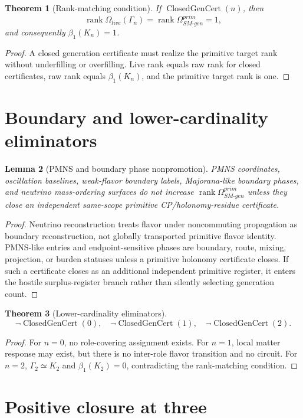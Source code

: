 \documentclass[11pt]{article}
\newcommand{\ClosedGenCert}{\operatorname{ClosedGenCert}}
\newcommand{\rank}{\operatorname{rank}}
\theoremstyle{definition}
\theoremstyle{plain}
\newtheorem{theorem}{Theorem}[section]
\newtheorem{lemma}[theorem]{Lemma}
\theoremstyle{remark}
\begin{document}
\begin{theorem}[Rank-matching condition]
If \(\ClosedGenCert(n)\), then
\[
\rank\Omega_{live}(\Gamma_n)=\rank\Omega_{SM\text{-}gen}^{prim}=1,
\]
and consequently \(\beta_1(K_n)=1\).
\end{theorem}
\begin{proof}
A closed generation certificate must realize the primitive target rank without underfilling or overfilling. Live rank equals raw rank for closed certificates, raw rank equals \(\beta_1(K_n)\), and the primitive target rank is one.
\end{proof}

\section{Boundary and lower-cardinality eliminators}

\begin{lemma}[PMNS and boundary phase nonpromotion]
PMNS coordinates, oscillation baselines, weak-flavor boundary labels, Majorana-like boundary phases, and neutrino mass-ordering surfaces do not increase \(\rank\Omega_{SM\text{-}gen}^{prim}\) unless they close an independent same-scope primitive CP/holonomy-residue certificate.
\end{lemma}
\begin{proof}
Neutrino reconstruction treats flavor under noncommuting propagation as boundary reconstruction, not globally transported primitive flavor identity. PMNS-like entries and endpoint-sensitive phases are boundary, route, mixing, projection, or burden statuses unless a primitive holonomy certificate closes. If such a certificate closes as an additional independent primitive register, it enters the hostile surplus-register branch rather than silently selecting generation count.
\end{proof}

\begin{theorem}[Lower-cardinality eliminators]
\[
\neg\ClosedGenCert(0),\quad \neg\ClosedGenCert(1),\quad \neg\ClosedGenCert(2).
\]
\end{theorem}
\begin{proof}
For \(n=0\), no role-covering assignment exists. For \(n=1\), local matter response may exist, but there is no inter-role flavor transition and no circuit. For \(n=2\), \(\Gamma_2\simeq K_2\) and \(\beta_1(K_2)=0\), contradicting the rank-matching condition.
\end{proof}

\section{Positive closure at three}
\end{document}
